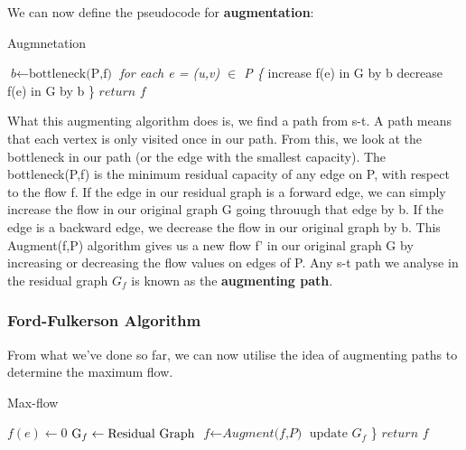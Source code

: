 \documentclass[11pt, oneside]{article}
\theoremstyle{definition}
\begin{document}
We can now define the pseudocode for \textbf{augmentation}:

\begin{algorithm}
\caption{Augmnetation}\label{euclid}
\begin{algorithmic}
\State $\textit{b} \gets \text{bottleneck(P,f)}$
\State \emph{for each e = (u,v) $\in$ P \{ }
 \State increase f(e) in G by b
  \State decrease f(e) in G by b
\EndIf
\State \}
\BState $\textit{return f}$
\EndProcedure
\end{algorithmic}
\end{algorithm}

What this augmenting algorithm does is, we find a path from s-t. A path means that each vertex is only visited once in our path. From this, we look at the bottleneck in our path (or the edge with the smallest capacity). The bottleneck(P,f) is the minimum residual capacity of any edge on P, with respect to the flow f. If the edge in our residual graph is a forward edge, we can simply increase the flow in our original graph G going throuugh that edge by b. If the edge is a backward edge, we decrease the flow in our original graph by b. This Augment(f,P) algorithm gives us a new flow f' in our original graph G by increasing or decreasing the flow values on edges of P. Any s-t path we analyse in the residual graph $G_f$ is known as the \textbf{augmenting path}.

\subsubsection{Ford-Fulkerson Algorithm}
From what we've done so far, we can now utilise the idea of augmenting paths to determine the maximum flow.
\begin{algorithm}
\caption{Max-flow}
\begin{algorithmic}
\State $f(e) \gets 0$
\State $\text G_f \gets \text{Residual Graph}$
\EndFor
{}
  \State $\textit{f} \gets \textit{Augment(f,P)}$
  \State $\text{update $G_f$}$
\EndWhile
\State \}
\BState $\textit{return f}$
\EndProcedure
\end{algorithmic}
\end{algorithm}
\end{document}
